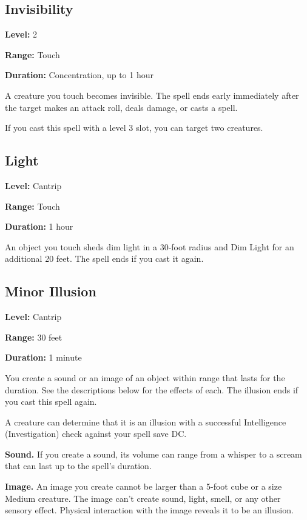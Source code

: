 \documentclass[12pt,letterpaper,twocolumn,openany,nodeprecatedcode,bg=none]{dndbook}
\let\oldsubsection\subsection
\renewcommand{\subsection}[1]{%
  \needspace{5\baselineskip}%
  \oldsubsection{#1}%
}
\begin{document}
\subsection{Invisibility}\label{invisibility}

\textbf{Level:} 2

\textbf{Range:} Touch

\textbf{Duration:} Concentration, up to 1 hour

A creature you touch becomes invisible. The spell ends early immediately
after the target makes an attack roll, deals damage, or casts a spell.

If you cast this spell with a level 3 slot, you can target two
creatures.

\subsection{Light}\label{light}

\textbf{Level:} Cantrip

\textbf{Range:} Touch

\textbf{Duration:} 1 hour

An object you touch sheds dim light in a 30-foot radius and Dim Light
for an additional 20 feet. The spell ends if you cast it again.

\subsection{Minor Illusion}\label{minor-illusion}

\textbf{Level:} Cantrip

\textbf{Range:} 30 feet

\textbf{Duration:} 1 minute

You create a sound or an image of an object within range that lasts for
the duration. See the descriptions below for the effects of each. The
illusion ends if you cast this spell again.

A creature can determine that it is an illusion with a successful
Intelligence (Investigation) check against your spell save DC.

\textbf{Sound.} If you create a sound, its volume can range from a
whisper to a scream that can last up to the spell's duration.

\textbf{Image.} An image you create cannot be larger than a 5-foot cube
or a size Medium creature. The image can't create sound, light, smell,
or any other sensory effect. Physical interaction with the image reveals
it to be an illusion.
\end{document}
